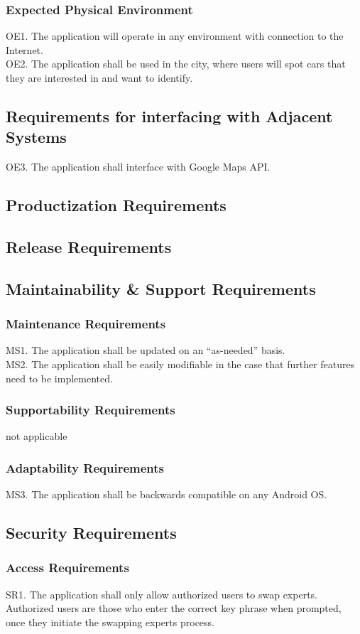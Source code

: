 \documentclass[12pt]{article}
\begin{document}
\subsubsection{Expected Physical Environment}
OE1. The application will operate in any environment with connection to the Internet.\\
OE2. The application shall be used in the city, where users will spot cars that they are interested in and want to identify.
\subsection{Requirements for interfacing with Adjacent Systems}
OE3. The application shall interface with Google Maps API.
\subsection{Productization Requirements}
\subsection{Release Requirements}
\subsection{Maintainability \& Support Requirements}
\subsubsection{Maintenance Requirements}
MS1. The application shall be updated on an “as-needed” basis.\\
MS2. The application shall be easily modifiable in the case that further features need to be implemented.
\subsubsection{Supportability Requirements}
not applicable
\subsubsection{Adaptability Requirements}
MS3. The application shall be backwards compatible on any Android OS.
\subsection{Security Requirements}
\subsubsection{Access Requirements}
SR1. The application shall only allow authorized users to swap experts. Authorized users are those who enter the correct key phrase when prompted, once they initiate the swapping experts process.
\end{document}
